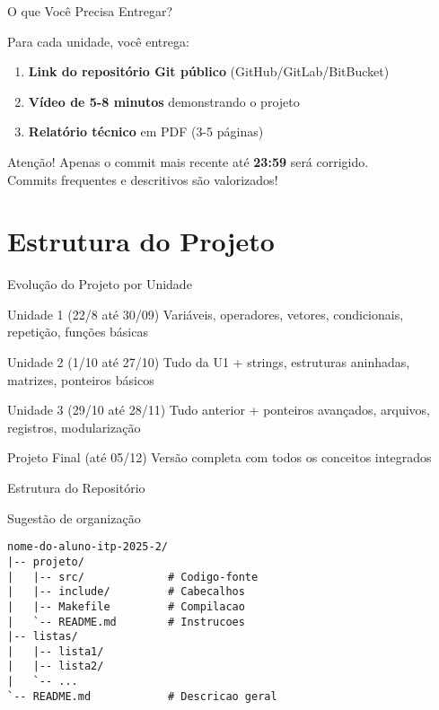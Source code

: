 \documentclass[10pt]{beamer}
\begin{document}
\begin{frame}{O que Você Precisa Entregar?}
	\begin{block}{Para cada unidade, você entrega:}
		\begin{enumerate}
			\item \textbf{Link do repositório Git público} (GitHub/GitLab/BitBucket)
			\item \textbf{Vídeo de 5-8 minutos} demonstrando o projeto
			\item \textbf{Relatório técnico} em PDF (3-5 páginas)
		\end{enumerate}
	\end{block}
	
	\begin{alertblock}{Atenção!}
		Apenas o commit mais recente até \textbf{23:59} será corrigido.\\
		Commits frequentes e descritivos são valorizados!
	\end{alertblock}
\end{frame}

\section{Estrutura do Projeto}

\begin{frame}{Evolução do Projeto por Unidade}
	\begin{block}{Unidade 1 (22/8 até 30/09)}
		Variáveis, operadores, vetores, condicionais, repetição, funções básicas
	\end{block}
	
	\begin{block}{Unidade 2 (1/10 até 27/10)}
		Tudo da U1 + strings, estruturas aninhadas, matrizes, ponteiros básicos
	\end{block}
	
	\begin{block}{Unidade 3 (29/10 até 28/11)}
		Tudo anterior + ponteiros avançados, arquivos, registros, modularização
	\end{block}
	
	\begin{exampleblock}{Projeto Final (até 05/12)}
		Versão completa com todos os conceitos integrados
	\end{exampleblock}
\end{frame}

\begin{frame}[fragile]{Estrutura do Repositório}
	\begin{exampleblock}{Sugestão de organização}
		\begin{lstlisting}
nome-do-aluno-itp-2025-2/
|-- projeto/
|   |-- src/             # Codigo-fonte
|   |-- include/         # Cabecalhos
|   |-- Makefile         # Compilacao
|   `-- README.md        # Instrucoes
|-- listas/
|   |-- lista1/
|   |-- lista2/
|   `-- ...
`-- README.md            # Descricao geral
		\end{lstlisting}
	\end{exampleblock}
\end{frame}
\end{document}
